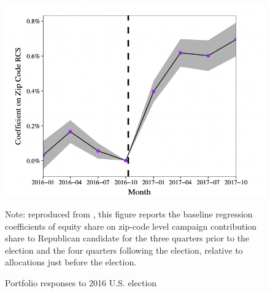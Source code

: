 \begin{figure}[!ht] \centering  %
	\caption{Portfolio responses to 2016 U.S. election}
	\label{fig:parker}
	\centerline{\includegraphics[width=\textwidth]{./figures/parker.png}}
	\begin{flushleft}
		{\footnotesize Note: reproduced from \cite{meeuwis2018belief}, this figure reports the baseline regression coefficients of equity share on zip-code level  campaign contribution share to Republican candidate for the three quarters prior to the election and the four quarters following the election, relative to allocations just before the election.}
	\end{flushleft}
\end{figure}
